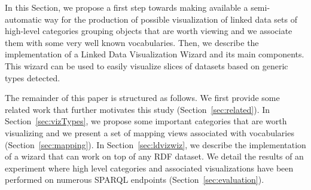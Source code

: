 In this Section, we propose a first step towards making available a semi-automatic way for the production of possible visualization of linked data sets of high-level categories grouping objects that are worth viewing and we associate them with some very well known vocabularies. Then, we describe the implementation of a Linked Data Visualization Wizard and its main components. This wizard can be used to easily visualize slices of datasets based on generic types detected.

The remainder  of this paper is structured as follows. We first provide some related work that further motivates this study (Section~\ref{sec:related}). In Section~\ref{sec:vizTypes}, we propose some important categories that are worth visualizing and we present a set of mapping views associated with vocabularies (Section~\ref{sec:mapping}). In Section~\ref{sec:ldvizwiz}, we describe the implementation of a wizard that can work on top of any RDF dataset. We detail the results of an experiment where high level categories and associated visualizations have been performed on numerous SPARQL endpoints (Section~\ref{sec:evaluation}). 

